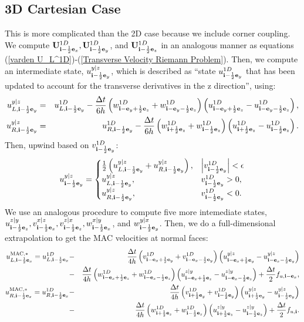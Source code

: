 \subsection{3D Cartesian Case}
This is more complicated than the 2D case because we include corner
coupling.  We compute ${\bf U}_{{\bf i}-\frac{1}{2}{\bf e}_x}^{1D},
{\bf U}_{{\bf i}-\frac{1}{2}{\bf e}_y}^{1D}$, and ${\bf U}_{{\bf i}-\frac{1}{2}{\bf e}_z}^{1D}$ in an
analogous manner as equations (\ref{varden U_L^1D})-(\ref{Transverse
  Velocity Riemann Problem}).  Then, we compute an intermediate state,
$u_{{\bf i}-\frac{1}{2}{\bf e}_y}^{y|z}$, which is described as ``state
$u_{{\bf i}-\frac{1}{2}{\bf e}_y}^{1D}$ that has been updated to account for the
transverse derivatives in the z direction'', using:
\begin{eqnarray}
u_{L,{\bf i}-\frac{1}{2}{\bf e}_y}^{y|z} &=& u_{L,{\bf i}-\frac{1}{2}{\bf e}_y}^{1D} - \frac{\Delta t}{6h}\left(w_{{\bf i}-{\bf e}_y+\frac{1}{2}{\bf e}_z}^{1D}+w_{{\bf i}-{\bf e}_y-\frac{1}{2}{\bf e}_z}^{1D}\right)\left(u_{{\bf i}-{\bf e}_y+\frac{1}{2}{\bf e}_z}^{1D}-u_{{\bf i}-{\bf e}_y-\frac{1}{2}{\bf e}_z}^{1D}\right), \\
u_{R,{\bf i}-\frac{1}{2}{\bf e}_y}^{y|z} &=& u_{R,{\bf i}-\frac{1}{2}{\bf e}_y}^{1D} - \frac{\Delta t}{6h}\left(w_{{\bf i}+\frac{1}{2}{\bf e}_z}^{1D}+w_{{\bf i}-\frac{1}{2}{\bf e}_z}^{1D}\right)\left(u_{{\bf i}+\frac{1}{2}{\bf e}_z}^{1D}-u_{{\bf i}-\frac{1}{2}{\bf e}_z}^{1D}\right).
\end{eqnarray}
Then, upwind based on $v_{{\bf i}-\frac{1}{2}{\bf e}_y}^{1D}$:
\begin{equation}
u_{{\bf i}-\frac{1}{2}{\bf e}_y}^{y|z} =
\begin{cases}
\frac{1}{2}\left(u_{L,{\bf i}-\frac{1}{2}{\bf e}_y}^{y|z} + u_{R,{\bf i}-\frac{1}{2}{\bf e}_y}^{y|z}\right), & \left|v_{{\bf i}-\frac{1}{2}{\bf e}_y}^{1D}\right| < \epsilon \\
u_{L,{\bf i}-\frac{1}{2}{\bf e}_y}^{y|z}, & v_{{\bf i}-\frac{1}{2}{\bf e}_y}^{1D} > 0, \\
u_{R,{\bf i}-\frac{1}{2}{\bf e}_y}^{y|z}, & v_{{\bf i}-\frac{1}{2}{\bf e}_y}^{1D} < 0.
\end{cases}
\end{equation}
We use an analogous procedure to compute five more intemediate states,
$u_{{\bf i}-\frac{1}{2}{\bf e}_z}^{z|y}, v_{{\bf i}-\frac{1}{2}{\bf e}_x}^{x|z},
v_{{\bf i}-\frac{1}{2}{\bf e}_z}^{z|x}, w_{{\bf i}-\frac{1}{2}{\bf e}_x}^{x|y}$, and
$w_{{\bf i}-\frac{1}{2}{\bf e}_y}^{y|x}$.  Then, we do a full-dimensional
extrapolation to get the MAC velocities at normal faces:
\begin{eqnarray}
u_{L,{\bf i}-\frac{1}{2}{\bf e}_x}^{\rm MAC,*} = u_{L,{\bf i}-\frac{1}{2}{\bf e}_x}^{1D} &-& \frac{\Delta t}{4h}\left(v_{{\bf i}-{\bf e}_x+\frac{1}{2}{\bf e}_y}^{1D}+v_{{\bf i}-{\bf e}_x-\frac{1}{2}{\bf e}_y}^{1D}\right)\left(u_{{\bf i}-{\bf e}_x+\frac{1}{2}{\bf e}_y}^{y|z}-u_{{\bf i}-{\bf e}_x-\frac{1}{2}{\bf e}_y}^{y|z}\right) \nonumber \\
&-& \frac{\Delta t}{4h}\left(w_{{\bf i}-{\bf e}_x+\frac{1}{2}{\bf e}_z}^{1D}+w_{{\bf i}-{\bf e}_x-\frac{1}{2}{\bf e}_z}^{1D}\right)\left(u_{{\bf i}-{\bf e}_x+\frac{1}{2}{\bf e}_z}^{z|y}-u_{{\bf i}-{\bf e}_x-\frac{1}{2}{\bf e}_z}^{z|y}\right) + \frac{\Delta t}{2}f_{u,{\bf i}-{\bf e}_x}, \\
u_{R,{\bf i}-\frac{1}{2}{\bf e}_x}^{\rm MAC,*} = u_{R,{\bf i}-\frac{1}{2}{\bf e}_x}^{1D} &-& \frac{\Delta t}{4h}\left(v_{{\bf i}+\frac{1}{2}{\bf e}_y}^{1D}+v_{{\bf i}-\frac{1}{2}{\bf e}_y}^{1D}\right)\left(u_{{\bf i}+\frac{1}{2}{\bf e}_y}^{y|z}-u_{{\bf i}-\frac{1}{2}{\bf e}_y}^{y|z}\right) \nonumber \\
&-& \frac{\Delta t}{4h}\left(w_{{\bf i}+\frac{1}{2}{\bf e}_z}^{1D}+w_{{\bf i}-\frac{1}{2}{\bf e}_z}^{1D}\right)\left(u_{{\bf i}+\frac{1}{2}{\bf e}_z}^{z|y}-u_{{\bf i}-\frac{1}{2}{\bf e}_z}^{z|y}\right) + \frac{\Delta t}{2}f_{u,{\bf i}}.
\end{eqnarray}
